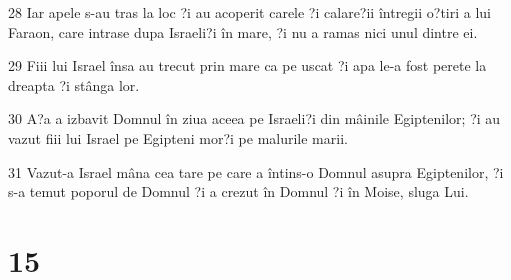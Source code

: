 \par 28 Iar apele s-au tras la loc ?i au acoperit carele ?i calare?ii întregii o?tiri a lui Faraon, care intrase dupa Israeli?i în mare, ?i nu a ramas nici unul dintre ei.
\par 29 Fiii lui Israel însa au trecut prin mare ca pe uscat ?i apa le-a fost perete la dreapta ?i stânga lor.
\par 30 A?a a izbavit Domnul în ziua aceea pe Israeli?i din mâinile Egiptenilor; ?i au vazut fiii lui Israel pe Egipteni mor?i pe malurile marii.
\par 31 Vazut-a Israel mâna cea tare pe care a întins-o Domnul asupra Egiptenilor, ?i s-a temut poporul de Domnul ?i a crezut în Domnul ?i în Moise, sluga Lui.

\chapter{15}

